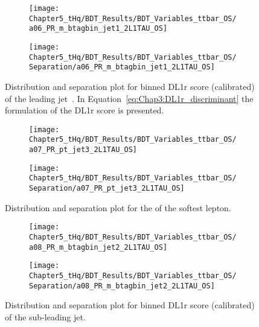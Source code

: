 \begin{figure}[h]
\centering
\begin{subfigure}{.45\textwidth}
  \centering
  \texttt{[image: Chapter5\_tHq/BDT\_Results/BDT\_Variables\_ttbar\_OS/a06\_PR\_m\_btagbin\_jet1\_2L1TAU\_OS]}
\end{subfigure}%
\begin{subfigure}{.55\textwidth}
  \centering
  \texttt{[image: Chapter5\_tHq/BDT\_Results/BDT\_Variables\_ttbar\_OS/Separation/a06\_PR\_m\_btagbin\_jet1\_2L1TAU\_OS]}
\end{subfigure}
\caption{Distribution and separation plot for binned DL1r score (calibrated) of the leading \btagged jet~\cite{ATLAS:2017gpy}. 
In Equation~\ref{eq:Chap3:DL1r_discriminant} the formulation of the DL1r score is presented.}
\label{fig:Appendix:BDTVARS:ttbarOS:a06_PR_m_btagbin_jet1}
\end{figure}

\begin{figure}[h]
\centering
\begin{subfigure}{.45\textwidth}
  \centering
  \texttt{[image: Chapter5\_tHq/BDT\_Results/BDT\_Variables\_ttbar\_OS/a07\_PR\_pt\_jet3\_2L1TAU\_OS]}
\end{subfigure}%
\begin{subfigure}{.55\textwidth}
  \centering
  \texttt{[image: Chapter5\_tHq/BDT\_Results/BDT\_Variables\_ttbar\_OS/Separation/a07\_PR\_pt\_jet3\_2L1TAU\_OS]}
\end{subfigure}
\caption{Distribution and separation plot for the \pT of the softest lepton.}
\label{fig:Appendix:BDTVARS:ttbarOS:a07_PR_pt_jet3}
\end{figure}

\begin{figure}[h]
\centering
\begin{subfigure}{.45\textwidth}
  \centering
  \texttt{[image: Chapter5\_tHq/BDT\_Results/BDT\_Variables\_ttbar\_OS/a08\_PR\_m\_btagbin\_jet2\_2L1TAU\_OS]}
\end{subfigure}%
\begin{subfigure}{.55\textwidth}
  \centering
  \texttt{[image: Chapter5\_tHq/BDT\_Results/BDT\_Variables\_ttbar\_OS/Separation/a08\_PR\_m\_btagbin\_jet2\_2L1TAU\_OS]}
\end{subfigure}
\caption{Distribution and separation plot for binned DL1r score (calibrated) of the sub-leading \btagged jet.}
\label{fig:Appendix:BDTVARS:ttbarOS:a08_PR_m_btagbin_jet2}
\end{figure}

